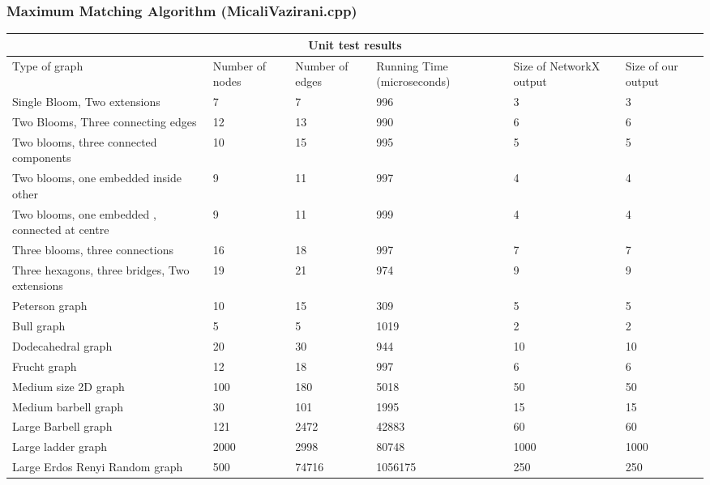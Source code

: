 \documentclass[12pt, a4paper]{article}
\begin{document}
\subsubsection{Maximum Matching Algorithm (MicaliVazirani.cpp)}
{\renewcommand{\arraystretch}{2}
\begin{longtable}{ |p{2cm}||p{2cm}|p{2cm}|p{2cm}|p{2cm}| p{2cm}|  }
 \hline
 \multicolumn{6}{|c|}{Unit test results} \\
 \hline
Type of graph & Number of nodes &Number of edges & Running Time (microseconds) & Size of NetworkX output & Size of our output\\
 \hline
Single Bloom, Two extensions   & 7   &7& 996&3&3  \\\hline
Two Blooms, Three connecting edges   & 12   &13& 990&6&6  \\\hline
Two blooms, three connected components   & 10   &15& 995&5&5  \\\hline
Two blooms, one embedded inside other   & 9   &11& 997&4&4  \\\hline
Two blooms, one embedded , connected at centre &9&11&999&4&4 \\\hline
Three blooms, three connections   & 16   &18& 997&7&7  \\\hline
Three hexagons, three bridges, Two extensions   &19  &21& 974&9&9  \\\hline
Peterson graph & 10  &15& 309&5&5  \\\hline
Bull graph   & 5   &5& 1019&2&2  \\\hline
Dodecahedral graph   &20  &30 & 944 &10&10  \\\hline
Frucht graph   &12   &18 & 997 &6&6  \\\hline
Medium size 2D graph   & 100   &180& 5018&50&50  \\\hline
Medium barbell graph   & 30   &101& 1995&15&15  \\\hline
Large Barbell graph   &121   &2472& 42883&60&60  \\\hline
Large ladder graph   & 2000   &2998& 80748&1000&1000  \\\hline
Large Erdos Renyi Random graph &500 &74716& 1056175&250&250 \\\hline

 \hline
\end{longtable}

}
\end{document}
